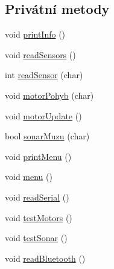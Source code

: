 \subsection*{Privátní metody}
\begin{DoxyCompactItemize}
\item 
void \hyperlink{class_sekacka_a6a2fcbb0bf1c52c918abeae2e8f2f37b}{print\+Info} ()
\item 
void \hyperlink{class_sekacka_a1c1a72cdf2e70b8bbc8867d827a33c36}{read\+Sensors} ()
\item 
int \hyperlink{class_sekacka_a0f1c6b2e3749c0d20e8d030c4ca2f41e}{read\+Sensor} (char)
\item 
void \hyperlink{class_sekacka_ad8b987c58efd929f4a1ab6fb83228c12}{motor\+Pohyb} (char)
\item 
void \hyperlink{class_sekacka_a6bc30aad27b57ebcf8dfbc8c13064d71}{motor\+Update} ()
\item 
bool \hyperlink{class_sekacka_a93bcb289ba8a8a6edf49c44118c63948}{sonar\+Muzu} (char)
\item 
void \hyperlink{class_sekacka_a3b8a0b514630002f3f1cb4e2a82825d8}{print\+Menu} ()
\item 
void \hyperlink{class_sekacka_a4314290befcd561c07bc33a9fb8c2d23}{menu} ()
\item 
void \hyperlink{class_sekacka_adf78055c6bcd3211df182efb9571e596}{read\+Serial} ()
\item 
void \hyperlink{class_sekacka_ace29e111ad870829ec7a5581318d989d}{test\+Motors} ()
\item 
void \hyperlink{class_sekacka_a2f4b2d82d958ad109742d3d341f8b5a4}{test\+Sonar} ()
\item 
void \hyperlink{class_sekacka_a31d02cd2da2b004f24cd5a7c18290824}{read\+Bluetooth} ()
\end{DoxyCompactItemize}
